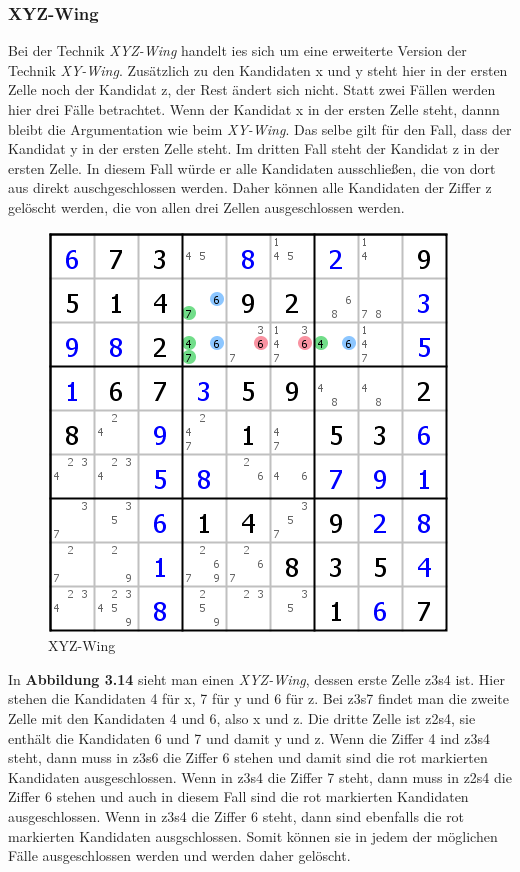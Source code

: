 \newpage
\subsubsection{XYZ-Wing}
Bei der Technik \textit{XYZ-Wing} handelt ies sich um eine erweiterte Version der Technik \textit{XY-Wing}. Zusätzlich zu den Kandidaten x und y steht hier in der ersten Zelle noch der Kandidat z, der Rest ändert sich nicht. Statt zwei Fällen werden hier drei Fälle betrachtet. Wenn der Kandidat x in der ersten Zelle steht, dannn bleibt die Argumentation wie beim \textit{XY-Wing}. Das selbe gilt für den Fall, dass der Kandidat y in der ersten Zelle steht. Im dritten Fall steht der Kandidat z in der ersten Zelle. In diesem Fall würde er alle Kandidaten ausschließen, die von dort aus direkt auschgeschlossen werden. Daher können alle Kandidaten der Ziffer z gelöscht werden, die von allen drei Zellen ausgeschlossen werden.

\begin{figure}[h]
\begin{center}
\includegraphics{./img/XYZ_Wing.png}
\caption{XYZ-Wing}
\end{center}
\end{figure}

In \textbf{Abbildung 3.14} sieht man einen \textit{XYZ-Wing}, dessen erste Zelle z3s4 ist. Hier stehen die Kandidaten 4 für x, 7 für y und 6 für z. Bei z3s7 findet man die zweite Zelle mit den Kandidaten 4 und 6, also x und z. Die dritte Zelle ist z2s4, sie enthält die Kandidaten 6 und 7 und damit y und z. Wenn die Ziffer 4 ind z3s4 steht, dann muss in z3s6 die Ziffer 6 stehen und damit sind die rot markierten Kandidaten ausgeschlossen. Wenn in z3s4 die Ziffer 7 steht, dann muss in z2s4 die Ziffer 6 stehen und auch in diesem Fall sind die rot markierten Kandidaten ausgeschlossen. Wenn in z3s4 die Ziffer 6 steht, dann sind ebenfalls die rot markierten Kandidaten ausgschlossen. Somit können sie in jedem der möglichen Fälle ausgeschlossen werden und werden daher gelöscht.